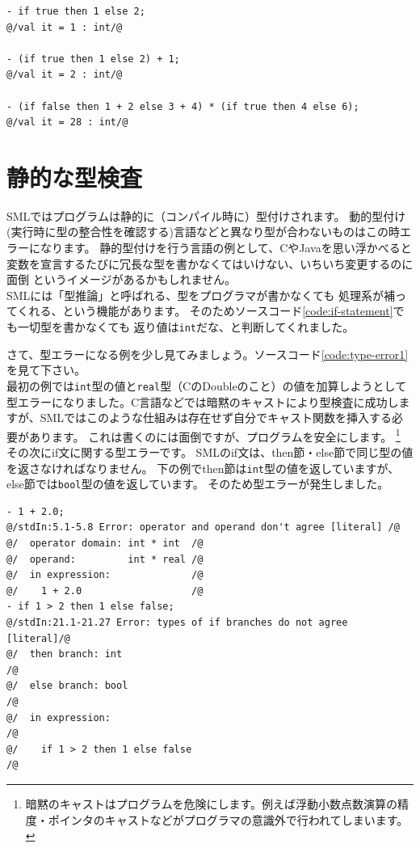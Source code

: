 \documentclass[11pt,a4paper]{article}
\begin{document}
\begin{lstlisting}[caption=if文は式,label=code:if-statement]
- if true then 1 else 2;
@/val it = 1 : int/@

- (if true then 1 else 2) + 1;
@/val it = 2 : int/@

- (if false then 1 + 2 else 3 + 4) * (if true then 4 else 6);
@/val it = 28 : int/@
\end{lstlisting}

\section{静的な型検査}
\label{sec:static-typing}

SMLではプログラムは静的に（コンパイル時に）型付けされます。
動的型付け(実行時に型の整合性を確認する)言語などと異なり型が合わないものはこの時エラーになります。
静的型付けを行う言語の例として、CやJavaを思い浮かべると
変数を宣言するたびに冗長な型を書かなくてはいけない、いちいち変更するのに面倒
というイメージがあるかもしれません。\\
SMLには「型推論」と呼ばれる、型をプログラマが書かなくても
処理系が補ってくれる、という機能があります。
そのためソースコード\ref{code:if-statement}でも一切型を書かなくても
返り値は\lstinline{int}だな、と判断してくれました。

さて、型エラーになる例を少し見てみましょう。ソースコード\ref{code:type-error1}を見て下さい。\\
最初の例では\lstinline{int}型の値と\lstinline{real}型（CのDoubleのこと）の値を加算しようとして型エラーになりました。C言語などでは暗黙のキャストにより型検査に成功しますが、SMLではこのような仕組みは存在せず自分でキャスト関数を挿入する必要があります。
これは書くのには面倒ですが、プログラムを安全にします。
\footnote{暗黙のキャストはプログラムを危険にします。例えば浮動小数点数演算の精度・ポインタのキャストなどがプログラマの意識外で行われてしまいます。}\\
その次にif文に関する型エラーです。
SMLのif文は、then節・else節で同じ型の値を返さなければなりません。
下の例でthen節は\lstinline{int}型の値を返していますが、else節では\lstinline{bool}型の値を返しています。
そのため型エラーが発生しました。

\begin{lstlisting}[label=code:type-error1,caption=型エラー１]
- 1 + 2.0;
@/stdIn:5.1-5.8 Error: operator and operand don't agree [literal] /@
@/  operator domain: int * int  /@
@/  operand:         int * real /@
@/  in expression:              /@
@/    1 + 2.0                   /@
- if 1 > 2 then 1 else false;
@/stdIn:21.1-21.27 Error: types of if branches do not agree [literal]/@
@/  then branch: int                                                 /@
@/  else branch: bool                                                /@
@/  in expression:                                                   /@
@/    if 1 > 2 then 1 else false                                     /@
\end{lstlisting}
\end{document}

